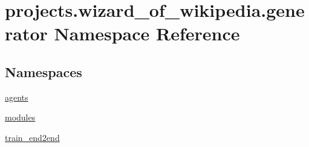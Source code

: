 \hypertarget{namespaceprojects_1_1wizard__of__wikipedia_1_1generator}{}\section{projects.\+wizard\+\_\+of\+\_\+wikipedia.\+generator Namespace Reference}
\label{namespaceprojects_1_1wizard__of__wikipedia_1_1generator}
\subsection*{Namespaces}
\begin{DoxyCompactItemize}
\item 
 \hyperlink{namespaceprojects_1_1wizard__of__wikipedia_1_1generator_1_1agents}{agents}
\item 
 \hyperlink{namespaceprojects_1_1wizard__of__wikipedia_1_1generator_1_1modules}{modules}
\item 
 \hyperlink{namespaceprojects_1_1wizard__of__wikipedia_1_1generator_1_1train__end2end}{train\+\_\+end2end}
\end{DoxyCompactItemize}
